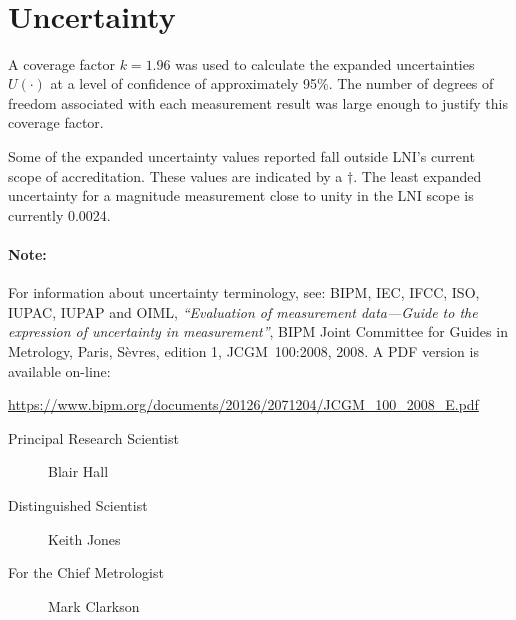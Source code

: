 \documentclass[11pt,a4paper]{article}
\newcommand{\referenceGUM}{
For information about uncertainty terminology, see: 
BIPM, IEC, IFCC, ISO, IUPAC, IUPAP and OIML, 
\textit{``Evaluation of measurement data---Guide to the expression of uncertainty in measurement''}, 
BIPM Joint Committee for Guides in Metrology, Paris, S\`evres, edition 1, JCGM~100:2008, 2008. 
A PDF version is available on-line:

\begin{center}
	\href{%
		https://www.bipm.org/documents/20126/2071204/JCGM_100_2008_E.pdf
	}{%
		https://www.bipm.org/documents/20126/2071204/JCGM\_100\_2008\_E.pdf
	}
\end{center}
}
\newcommand{\signatureA}[1]{
    \renewcommand{\signatureA}{
    \texttt{[image: \#1]}  
    }
}
\newcommand{\signatureB}[1]{
    \renewcommand{\signatureB}{
    \texttt{[image: \#1]}  
    }
}
\newcommand{\signatureAName}[1]{\renewcommand{\signatureAName}{#1}}
\newcommand{\signatureBName}[1]{\renewcommand{\signatureBName}{#1}}
\newcommand{\signatureARole}[1]{\renewcommand{\signatureARole}{#1}}
\newcommand{\signatureBRole}[1]{\renewcommand{\signatureBRole}{#1}}
\newcommand{\chiefMetrologistName}[1]{
	\renewcommand{\chiefMetrologistName}{#1} 
	\newcommand{\chiefMetrologistRole}{Chief Metrologist}   
}
\newcommand{\chiefMetrologistDelegate}[1]{
	\renewcommand{\chiefMetrologistName}{#1} 
	\newcommand{\chiefMetrologistRole}{For the Chief Metrologist}   
}
\newcommand{\signaturesAB}{%
    \vspace*{4\baselineskip}
	\begin{center}
		\begin{minipage}{\textwidth}
		\begin{description}
		    \item[\signatureARole\;] \signatureAName
		    \item[\signatureBRole\:] \signatureBName
		    \item[\chiefMetrologistRole\:] \chiefMetrologistName
		\end{description}
		\end{minipage}
	\end{center}
}
\begin{document}
\begin{center}
\begin{singlespace}
\[\begin{array}{SSSSS}
		\end{array}
	\]
	\label{fig1}     %
	
\end{singlespace}
\end{center}


\section{Uncertainty}
A coverage factor $k=1.96$ was used to calculate the expanded uncertainties $U(\cdot)$ at a level of confidence of approximately 95\%. The number of degrees of freedom associated with each measurement result was large enough to justify this coverage factor.  

Some of the expanded uncertainty values reported fall outside LNI's current scope of accreditation. These values are indicated by a $\dagger$. The least expanded uncertainty for a magnitude measurement close to unity in the LNI scope is currently 0.0024. 

\paragraph{Note:} \referenceGUM	%

\signatureAName{Blair Hall}
\signatureBName{Keith Jones} 
\signatureARole{Principal Research Scientist}
\signatureBRole{Distinguished Scientist}
\chiefMetrologistDelegate{Mark Clarkson}
\signaturesAB
\end{document}
